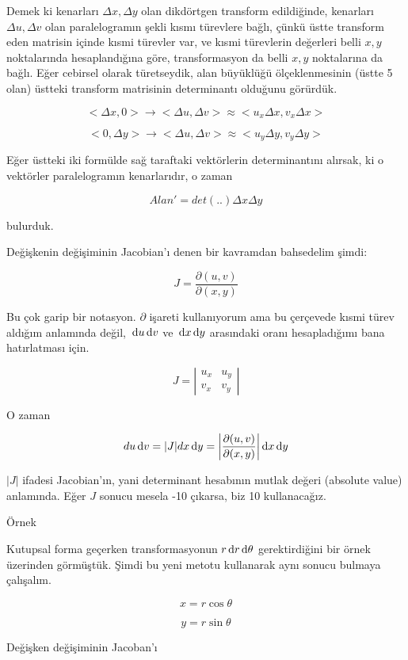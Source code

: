 \documentclass[12pt,fleqn]{article}\usepackage{../../common}
\begin{document}
Demek ki kenarları $\Delta x,\Delta y$ olan dikdörtgen transform edildiğinde,
kenarları $\Delta u,\Delta v$ olan paralelogramın şekli kısmı türevlere bağlı,
çünkü üstte transform eden matrisin içinde kısmi türevler var, ve kısmi
türevlerin değerleri belli $x,y$ noktalarında hesaplandığına göre,
transformasyon da belli $x,y$ noktalarına da bağlı. Eğer cebirsel olarak
türetseydik, alan büyüklüğü ölçeklenmesinin (üstte 5 olan) üstteki transform
matrisinin determinantı olduğunu görürdük.

$$< \Delta x,0 > \to < \Delta u, \Delta v > \approx < u_x \Delta x, v_x\Delta x > $$

$$ < 0, \Delta y > \to < \Delta u,\Delta v > \approx < u_y\Delta y,v_y \Delta y > $$

Eğer üstteki iki formülde sağ taraftaki vektörlerin determinantını alırsak,
ki o vektörler paralelogramın kenarlarıdır, o zaman 

$$ Alan' =  det(..)\Delta x \Delta y  $$

bulurduk. 

Değişkenin değişiminin Jacobian'ı denen bir kavramdan bahsedelim şimdi: 

$$ J = \frac{\partial (u,v)}{\partial(x,y)} $$

Bu çok garip bir notasyon. $\partial$ işareti kullanıyorum ama bu çerçevede
kısmi türev aldığım anlamında değil, $\,\mathrm{d} u \,\mathrm{d} v$ ve $\,\mathrm{d} x \,\mathrm{d} y$ arasındaki
oranı hesapladığımı bana hatırlatması için.

$$ J =  \left|\begin{array}{rr}
u_x & u_y \\
v_x & v_y
\end{array}\right|
$$

O zaman 

$$ du \,\mathrm{d} v = |J| dx \,\mathrm{d} y =
\bigg|\frac{\partial (u,v)}{\partial(x,y)}\bigg |
\,\mathrm{d} x \,\mathrm{d} y
$$

$|J|$ ifadesi Jacobian'ın, yani determinant hesabının mutlak değeri (absolute
value) anlamında. Eğer $J$ sonucu mesela -10 çıkarsa, biz 10 kullanacağız.

Örnek 

Kutupsal forma geçerken transformasyonun $r \,\mathrm{d} r \,\mathrm{d} \theta$ gerektirdiğini
bir örnek üzerinden görmüştük. Şimdi bu yeni metotu kullanarak aynı sonucu
bulmaya çalışalım. 

$$  x= r \cos \theta $$

$$  y= r \sin\theta $$

Değişken değişiminin Jacoban'ı
\end{document}
